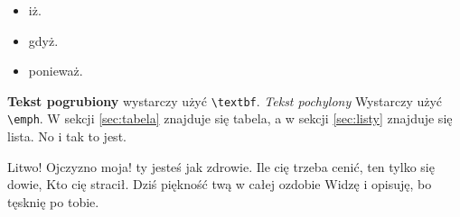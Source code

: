 \documentclass{article}
\begin{document}
\begin{itemize}
    \item iż.
    \item gdyż.
    \item ponieważ.
\end{itemize}


\textbf{Tekst pogrubiony} wystarczy użyć \texttt{\textbackslash textbf}. \emph{Tekst pochylony} Wystarczy użyć \texttt{\textbackslash emph}. W sekcji \ref{sec:tabela} znajduje się tabela, a w sekcji \ref{sec:listy} znajduje się lista. No i tak to jest.

Litwo! Ojczyzno moja! ty jesteś jak zdrowie.
Ile cię trzeba cenić, ten tylko się dowie,
Kto cię stracił. Dziś piękność twą w całej ozdobie
Widzę i opisuję, bo tęsknię po tobie.
\end{document}
